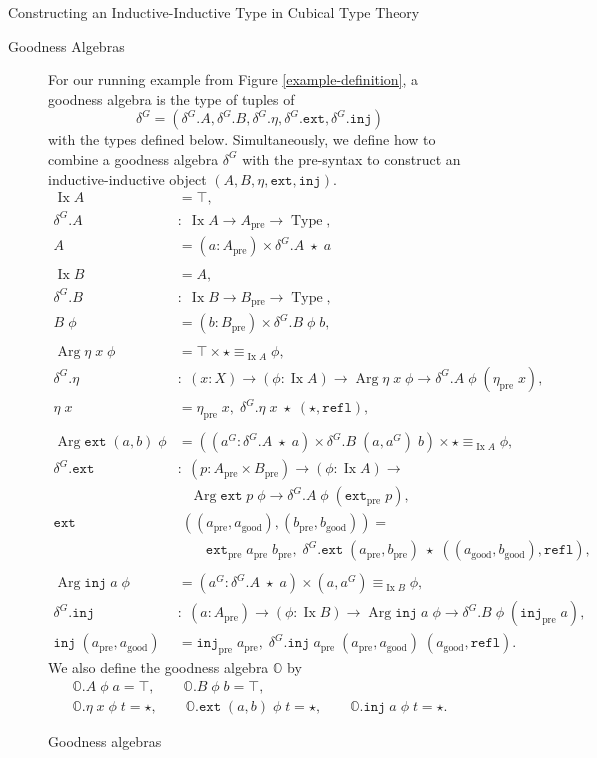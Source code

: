 \documentclass[runningheads]{llncs}
\DeclareMathOperator{\USet}{Type}
\DeclareMathOperator{\Arg}{Arg}
\DeclareMathOperator{\Ix}{Ix}
\newcommand{\pre}[1]{{#1}_\text{pre}}
\newcommand{\good}[1]{{#1}_\text{good}}
\newcommand{\IdA}[3]{{#1}\equiv_{#3}{#2}}
\newcommand{\bbO}{\mathbb{O}}
\newcommand{\join}{\texttt{ext}}
\newcommand{\inj}{\texttt{inj}}
\newcommand{\refl}{\texttt{refl}}
\begin{document}
\begin{section}{Constructing an Inductive-Inductive Type in Cubical Type Theory}
\begin{subsection}{Goodness Algebras}
\begin{figure}[htb]
\begin{flushleft}
For our running example from Figure \ref{example-definition}, a goodness algebra is the type of tuples of \[\delta^G = (\delta^G.A, \delta^G.B, \delta^G.\eta, \delta^G.\join, \delta^G.\inj)\] with the types defined below. Simultaneously, we define how to combine a goodness algebra $\delta^G$ with the pre-syntax to construct an inductive-inductive object $(A, B, \eta, \join, \inj)$.
\begin{align*}
\Ix A &= \top,\\
\delta^G.A &:\; \Ix A \to \pre{A} \to \USet,\\
A &= (a : \pre{A}) \times \delta^G.A\;\star\;a\\
\\[-.11in]
\Ix B &= A,\\
\delta^G.B &:\; \Ix B \to \pre{B} \to \USet,\\
B\;\phi &= (b : \pre{B}) \times \delta^G.B\;\phi\;b,\\
\\[-.11in]
\Arg \eta\;x\;\phi &= \top \times \IdA{\star}{\phi}{\Ix A},\\
\delta^G.\eta &:\; (x : X) \to (\phi : \Ix A) \to \Arg \eta \;x\;\phi \to \delta^G.A\;\phi\;(\pre{\eta}\;x),\\
\eta\;x &= \pre{\eta}\;x,\; \delta^G.\eta\;x\;\star\;(\star,\refl),\\
\\[-.11in]
\Arg \join\;(a,b)\;\phi &= ((a^G : \delta^G.A\;\star\;a) \times \delta^G.B\;(a,a^G)\;b) \times\IdA{\star}{\phi}{\Ix A},\\
\delta^G.\join &:\; (p : \pre{A} \times \pre{B}) \to (\phi : \Ix A) \to\\&\;\;\; \Arg\join\;p\;\phi \to \delta^G.A\;\phi\;(\pre{\join}\;p),\\
\join&\;((\pre{a}, \good{a}), (\pre{b}, \good{b})) =\\&\qquad\pre{\join}\;\pre{a}\;\pre{b},\; \delta^G.\join\;(\pre{a}, \pre{b})\;\star\;((\good{a}, \good{b}),\refl),\\
\\[-.11in]
\Arg \inj\;a\;\phi &= (a^G : \delta^G.A\;\star\;a) \times \IdA{(a , a^G)}{\phi}{\Ix B},\\
\delta^G.\inj &:\; (a : \pre{A}) \to (\phi : \Ix B) \to \Arg\inj\;a\;\phi \to \delta^G.B\;\phi\;(\pre{\inj}\;a),\\
\inj\;(\pre{a}, \good{a}) &= \pre{\inj}\;\pre{a},\; \delta^G.\inj\;\pre{a}\;(\pre{a}, \good{a})\;(\good{a}, \refl).
\end{align*}
We also define the goodness algebra $\bbO$ by
\begin{gather*}
\bbO.A\;\phi\;a = \top,\qquad
\bbO.B\;\phi\;b = \top,\\
\bbO.\eta\;x\;\phi\;t = \star,\qquad
\bbO.\join\;(a, b)\;\phi\;t = \star,\qquad
\bbO.\inj\;a\;\phi\;t = \star.
\end{gather*}
\end{flushleft}
\caption{\label{example-goodness-algebra-def}Goodness algebras}
\end{figure}


\end{subsection}
\end{section}
\end{document}

